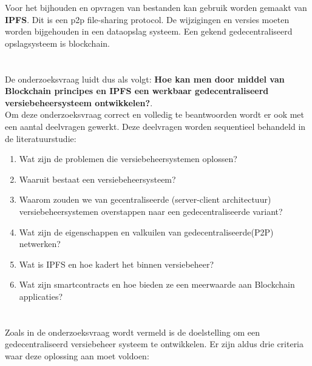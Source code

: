 Voor het bijhouden en opvragen van bestanden kan gebruik worden gemaakt van \textbf{IPFS}. Dit is een p2p file-sharing protocol. De wijzigingen en versies moeten worden bijgehouden in een dataopslag systeem. Een gekend gedecentraliseerd opslagsysteem is blockchain.


\section{}
\label{sec:onderzoeksvraag}
De onderzoeksvraag luidt dus als volgt: \textbf{Hoe kan men door middel van Blockchain principes en IPFS een werkbaar gedecentraliseerd versiebeheersysteem ontwikkelen?}.\\

Om deze onderzoeksvraag correct en volledig te beantwoorden wordt er ook met een aantal deelvragen gewerkt. Deze deelvragen worden sequentieel behandeld in de literatuurstudie:

\begin{enumerate}
\item Wat zijn de problemen die versiebeheersystemen oplossen? \\
\item Waaruit bestaat een versiebeheersysteem? \\
\item Waarom zouden we van gecentraliseerde (server-client architectuur) versiebeheersystemen overstappen naar een gedecentraliseerde variant?         \\
\item Wat zijn de eigenschappen en valkuilen van gedecentraliseerde(P2P) netwerken?\\
\item Wat is IPFS en hoe kadert het binnen versiebeheer?\\
\item Wat zijn smartcontracts en hoe bieden ze een meerwaarde aan Blockchain applicaties?\\
\end{enumerate}


\section{}
\label{sec:onderzoeksdoelstelling}

Zoals in de onderzoeksvraag wordt vermeld is de doelstelling om een gedecentraliseerd versiebeheer systeem te ontwikkelen. Er zijn aldus drie criteria waar deze oplossing aan moet voldoen:

